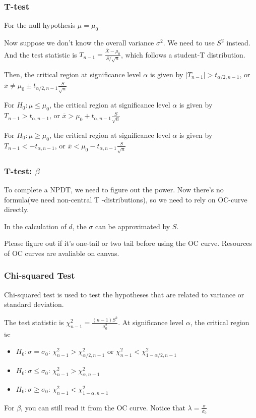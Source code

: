 \documentclass{beamer}
\begin{document}
\begin{frame}
    \frametitle{T-test}
    For the null hypothesis $\mu=\mu_0$ \par
    Now suppose we don't know the overall variance $\sigma^2$. We need to use $S^2$ instead. And the test statistic is $T_{n-1}=\frac{\overline{X}-\mu_0}{S/\sqrt{n}}$, which follows a student-T distribution.\par
    Then, the critical region at significance level $\alpha$ is given by $|T_{n-1}|>t_{\alpha/2,n-1}$, or $\overline{x}\neq \mu_0\pm t_{\alpha/2,n-1}\frac{S}{\sqrt{n}}$\par
    \vspace*{0.3cm}
    For $H_0: \mu\leq \mu_0$, the critical region at significance level $\alpha$ is given by $T_{n-1}>t_{\alpha,n-1}$, or $\overline{x}> \mu_0+ t_{\alpha,n-1}\frac{S}{\sqrt{n}}$\par
    \vspace*{0.3cm}
    For $H_0: \mu\geq \mu_0$, the critical region at significance level $\alpha$ is given by $T_{n-1}<-t_{\alpha,n-1}$, or $\overline{x}< \mu_0- t_{\alpha,n-1}\frac{S}{\sqrt{n}}$\par

\end{frame}

\begin{frame}
    \frametitle{T-test: $\beta$}

    To complete a NPDT, we need to figure out the power. Now there's no formula(we need non-central T -distributions), so we need to rely on OC-curve directly.\par
    In the calculation of $d$, the $\sigma$ can be approximated by $S$.\par
    Please figure out if it's one-tail or two tail before using the OC curve. Resources of OC curves are avaliable on canvas.

\end{frame}

\begin{frame}
    \frametitle{Chi-squared Test}

    Chi-squared test is used to test the hypotheses that are related to variance or standard deviation.\par
    The test statistic is $\chi_{n-1}^2=\frac{(n-1)S^2}{\sigma_0^2}$. At significance level $\alpha$, the critical region is:
    \begin{itemize}
        \item $H_0: \sigma=\sigma_0$: $\chi_{n-1}^2>\chi_{\alpha/2,n-1}^2$ or $\chi_{n-1}^2<\chi_{1-\alpha/2,n-1}^2$
        \item $H_0: \sigma\leq \sigma_0$: $\chi_{n-1}^2>\chi_{\alpha,n-1}^2$ 
        \item $H_0: \sigma\geq \sigma_0$: $\chi_{n-1}^2<\chi_{1-\alpha,n-1}^2$
    \end{itemize}
    For $\beta$, you can still read it from the OC curve. Notice that $\lambda=\frac{\sigma}{\sigma_0}$

\end{frame}
\end{document}
